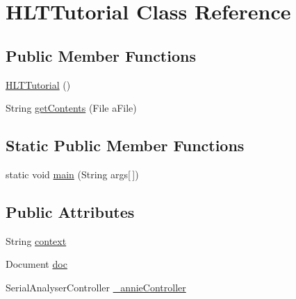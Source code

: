 \hypertarget{class_h_l_t_tutorial}{\section{H\-L\-T\-Tutorial Class Reference}
\label{class_h_l_t_tutorial}
}
\subsection*{Public Member Functions}
\begin{DoxyCompactItemize}
\item 
\hyperlink{class_h_l_t_tutorial_a140368203bdb4815acba0606719df6a7}{H\-L\-T\-Tutorial} ()
\item 
String \hyperlink{class_h_l_t_tutorial_a2df4fcba977cad0df60ff6dd6356dbb5}{get\-Contents} (File a\-File)
\end{DoxyCompactItemize}
\subsection*{Static Public Member Functions}
\begin{DoxyCompactItemize}
\item 
static void \hyperlink{class_h_l_t_tutorial_abf587005c096a97ec0c1d86d843aeb5c}{main} (String args\mbox{[}$\,$\mbox{]})
\end{DoxyCompactItemize}
\subsection*{Public Attributes}
\begin{DoxyCompactItemize}
\item 
String \hyperlink{class_h_l_t_tutorial_ae71fbcbcb26faf92a453dd4fad5a7a85}{context}
\item 
Document \hyperlink{class_h_l_t_tutorial_adc313cb5e485ec03e21897d5c0132591}{doc}
\item 
Serial\-Analyser\-Controller \hyperlink{class_h_l_t_tutorial_ae3ecde0fc3f5486e117de53e615058ca}{\-\_\-annie\-Controller}
\end{DoxyCompactItemize}
